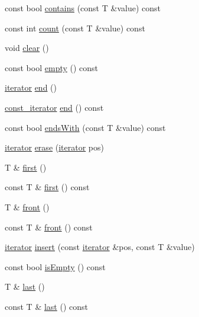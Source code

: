 \begin{DoxyCompactItemize}
\item 
const bool \hyperlink{classprism_1_1_list_a3b6d05cd9d1911861c7a440c291ccc26}{contains} (const T \&value) const 
\item 
const int \hyperlink{classprism_1_1_list_a3e274e926be4ac7664e8b1ba79cf3db9}{count} (const T \&value) const 
\item 
void \hyperlink{classprism_1_1_list_af51ed8f35ae20cc4639962a2dead76d3}{clear} ()
\item 
const bool \hyperlink{classprism_1_1_list_a8d58db1d27cc01ce3036d448f232ced4}{empty} () const 
\item 
\hyperlink{classprism_1_1_list_a6cf00c98a428ed325fe9ccc60d7ef95a}{iterator} \hyperlink{classprism_1_1_list_a47ef0b3d04fa49bd05f00a13bdfb2b93}{end} ()
\item 
\hyperlink{classprism_1_1_list_a038bd36af263a85110467528db8305d5}{const\+\_\+iterator} \hyperlink{classprism_1_1_list_acaa7fffb63e4f955b0f77cf9899c924c}{end} () const 
\item 
const bool \hyperlink{classprism_1_1_list_a8575a0221bf51275ac186406d656a4f3}{ends\+With} (const T \&value) const 
\item 
\hyperlink{classprism_1_1_list_a6cf00c98a428ed325fe9ccc60d7ef95a}{iterator} \hyperlink{classprism_1_1_list_ab6440bbb53502f6e689c1c9274ffa6f8}{erase} (\hyperlink{classprism_1_1_list_a6cf00c98a428ed325fe9ccc60d7ef95a}{iterator} pos)
\item 
T \& \hyperlink{classprism_1_1_list_a5c20cbafe00fff084b1c48016a0b04f8}{first} ()
\item 
const T \& \hyperlink{classprism_1_1_list_a2ff7747c0784e8f8f71a9365a241601e}{first} () const 
\item 
T \& \hyperlink{classprism_1_1_list_a64abe6201e00a727d55299242b0f5aee}{front} ()
\item 
const T \& \hyperlink{classprism_1_1_list_a5319d6f066eaa794399d36177275f800}{front} () const 
\item 
\hyperlink{classprism_1_1_list_a6cf00c98a428ed325fe9ccc60d7ef95a}{iterator} \hyperlink{classprism_1_1_list_a94237ea84df5f1e804ab6ff2717a5634}{insert} (const \hyperlink{classprism_1_1_list_a6cf00c98a428ed325fe9ccc60d7ef95a}{iterator} \&pos, const T \&value)
\item 
const bool \hyperlink{classprism_1_1_list_ac0f60893564ab12f9c9974ba685db2b0}{is\+Empty} () const 
\item 
T \& \hyperlink{classprism_1_1_list_a16681bef913b82d9951330c7526cdb3f}{last} ()
\item 
const T \& \hyperlink{classprism_1_1_list_acf84da5c22f8fe60c182de1f29171ea1}{last} () const 

\end{DoxyCompactItemize}
